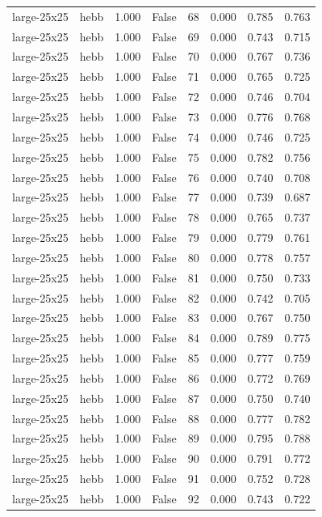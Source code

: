 \begin{tabular}{llrrrrrr}
large-25x25 & hebb & 1.000 & False & 68 & 0.000 & 0.785 & 0.763 \\
large-25x25 & hebb & 1.000 & False & 69 & 0.000 & 0.743 & 0.715 \\
large-25x25 & hebb & 1.000 & False & 70 & 0.000 & 0.767 & 0.736 \\
large-25x25 & hebb & 1.000 & False & 71 & 0.000 & 0.765 & 0.725 \\
large-25x25 & hebb & 1.000 & False & 72 & 0.000 & 0.746 & 0.704 \\
large-25x25 & hebb & 1.000 & False & 73 & 0.000 & 0.776 & 0.768 \\
large-25x25 & hebb & 1.000 & False & 74 & 0.000 & 0.746 & 0.725 \\
large-25x25 & hebb & 1.000 & False & 75 & 0.000 & 0.782 & 0.756 \\
large-25x25 & hebb & 1.000 & False & 76 & 0.000 & 0.740 & 0.708 \\
large-25x25 & hebb & 1.000 & False & 77 & 0.000 & 0.739 & 0.687 \\
large-25x25 & hebb & 1.000 & False & 78 & 0.000 & 0.765 & 0.737 \\
large-25x25 & hebb & 1.000 & False & 79 & 0.000 & 0.779 & 0.761 \\
large-25x25 & hebb & 1.000 & False & 80 & 0.000 & 0.778 & 0.757 \\
large-25x25 & hebb & 1.000 & False & 81 & 0.000 & 0.750 & 0.733 \\
large-25x25 & hebb & 1.000 & False & 82 & 0.000 & 0.742 & 0.705 \\
large-25x25 & hebb & 1.000 & False & 83 & 0.000 & 0.767 & 0.750 \\
large-25x25 & hebb & 1.000 & False & 84 & 0.000 & 0.789 & 0.775 \\
large-25x25 & hebb & 1.000 & False & 85 & 0.000 & 0.777 & 0.759 \\
large-25x25 & hebb & 1.000 & False & 86 & 0.000 & 0.772 & 0.769 \\
large-25x25 & hebb & 1.000 & False & 87 & 0.000 & 0.750 & 0.740 \\
large-25x25 & hebb & 1.000 & False & 88 & 0.000 & 0.777 & 0.782 \\
large-25x25 & hebb & 1.000 & False & 89 & 0.000 & 0.795 & 0.788 \\
large-25x25 & hebb & 1.000 & False & 90 & 0.000 & 0.791 & 0.772 \\
large-25x25 & hebb & 1.000 & False & 91 & 0.000 & 0.752 & 0.728 \\
large-25x25 & hebb & 1.000 & False & 92 & 0.000 & 0.743 & 0.722 \\

\end{tabular}
